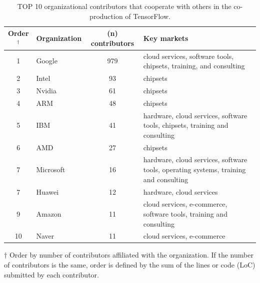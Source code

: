 \documentclass[CHICAGO,Times1COL]{WileyNJDv5} %
\begin{document}
\begin{table}[h]
 \caption{TOP 10 organizational contributors that cooperate with others in the co-production of TensorFlow\label{tcomercial}.}
\begin{tabularx}{1.0\textwidth}[]{clcl}
\toprule 
Order$^\dagger$ & Organization & (n) contributors & Key markets\\
\midrule 
1 & Google & 979 & cloud services, software tools, chipsets, training, and consulting  \\
2 & Intel & 93 & chipsets \\
3 &  Nvidia & 61 & chipsets \\
4 & ARM & 48&  chipsets \\
5 & IBM & 41 & hardware, cloud services, software tools, chipsets, training and consulting \\
6 & AMD & 27 & chipsets \\ 
7 & Microsoft & 16 &  hardware, cloud services, software tools, operating systems, training and consulting \\
7 & Huawei & 12 & hardware, cloud services \\
9 & Amazon & 11 & cloud services, e-commerce, software tools, training and consulting \\
10 & Naver & 11  &  cloud services, e-commerce \\
\bottomrule
\end{tabularx}
\begin{tablenotes}
\item {$\dagger$  Order by number of contributors affiliated with the organization. If the number of contributors is the same, order is defined by the sum of the lines or code (LoC) submitted by each contributor.}
\end{tablenotes}
\end{table}
\end{document}
